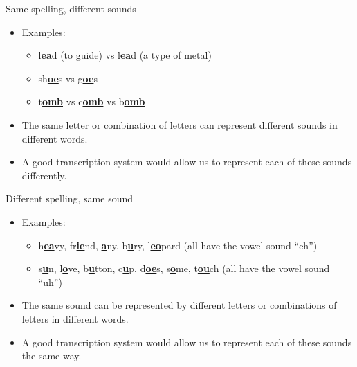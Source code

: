 \documentclass[professionalfonts]{beamer}
\begin{document}
\begin{frame}{Same spelling, different sounds}
    \begin{itemize}
        \item Examples:
        \begin{itemize}
            \item l\underline{\textbf{ea}}d (to guide) vs l\underline{\textbf{ea}}d (a type of metal)
            \item sh\underline{\textbf{oe}}s vs g\underline{\textbf{oe}}s
            \item t\underline{\textbf{omb}} vs c\underline{\textbf{omb}} vs b\underline{\textbf{omb}}
        \end{itemize}
        \item The same letter or combination of letters can represent different sounds in different words.
        \item A good transcription system would allow us to represent each of these sounds differently.
    \end{itemize}
\end{frame}

\begin{frame}{Different spelling, same sound}
    \begin{itemize}
        \item Examples:
        \begin{itemize}
            \item h\underline{\textbf{ea}}vy, fr\underline{\textbf{ie}}nd, \underline{\textbf{a}}ny, b\underline{\textbf{u}}ry, l\underline{\textbf{eo}}pard (all have the vowel sound ``eh'')
            \item s\underline{\textbf{u}}n, l\underline{\textbf{o}}ve, b\underline{\textbf{u}}tton, c\underline{\textbf{u}}p, d\underline{\textbf{oe}}s, s\underline{\textbf{o}}me, t\underline{\textbf{ou}}ch (all have the vowel sound ``uh'')
        \end{itemize}
        \item The same sound can be represented by different letters or combinations of letters in different words.
        \item A good transcription system would allow us to represent each of these sounds the same way.
    \end{itemize}
\end{frame}
\end{document}
